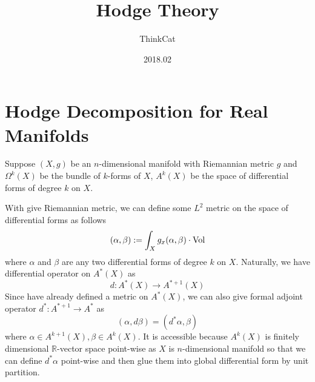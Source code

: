 \documentclass{amsart}
\title{Hodge Theory}
\author{ThinkCat}
\date{2018.02}
\begin{document}
\maketitle
\tableofcontents

\section{Hodge Decomposition for Real Manifolds}
Suppose $(X,g)$ be an $n$-dimensional manifold with Riemannian metric $g$ and $\Omega^k (X)$ be the bundle of $k$-forms of $X$, $A^k (X)$ be the space of differential forms of degree $k$ on $X$.

With give Riemannian metric, we can define some $L^2$ metric on the space of differential forms as follows
$$
(\alpha, \beta) := \int_{X} g_x(\alpha, \beta) \cdot \operatorname*{Vol}   
$$
where $\alpha$ and $\beta$ are any two differential forms of degree $k$ on $X$. Naturally, we have differential operator on $A^*(X)$ as
$$
d: A^*(X) \rightarrow A^{*+1}(X)
$$
Since have already defined a metric on $A^*(X)$,  we can also give formal adjoint operator $d^*: A^{*+1} \rightarrow A^*$ as
$$
(\alpha, d\beta)=(d^*\alpha, \beta)
$$
where $\alpha \in A^{k+1}(X), \beta \in A^k(X)$. It is accessible because $A^k(X)$ is finitely dimensional $\mathbb{R}$-vector space point-wise as $X$ is $n$-dimensional manifold so that we can define $d^* \alpha$ point-wise and then glue them into global differential form by unit partition.
\end{document}
